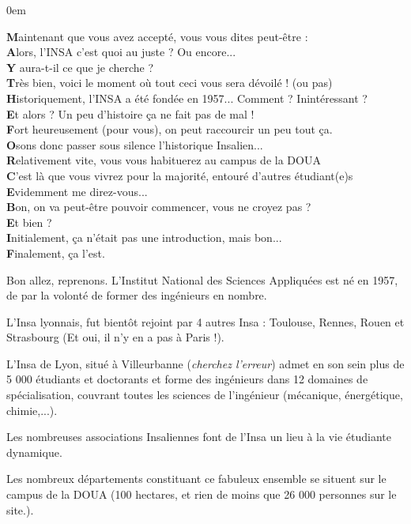 {
    \footnotesize
    \parindent 0em
    \begin{changemargin}{-1cm}{0cm}
\textbf{M}aintenant que vous avez accepté, vous vous dites peut-être :\\
\textbf{A}lors, l'INSA c'est quoi au juste ? Ou encore...\\
\textbf{Y} aura-t-il ce que je cherche ?\\

\textbf{T}rès bien, voici le moment où tout ceci vous sera dévoilé ! (ou pas)\\
\textbf{H}istoriquement, l'INSA a été fondée en 1957... Comment ? Inintéressant ?\\
\textbf{E}t alors ? Un peu d'histoire ça ne fait pas de mal !\\

\textbf{F}ort heureusement (pour vous), on peut raccourcir un peu tout ça.\\
\textbf{O}sons donc passer sous silence l'historique Insalien...\\
\textbf{R}elativement vite, vous vous habituerez au campus de la DOUA\\
\textbf{C}'est là que vous vivrez pour la majorité, entouré d'autres étudiant(e)s\\
\textbf{E}videmment me direz-vous...\\

\textbf{B}on, on va peut-être pouvoir commencer, vous ne croyez pas ?\\
\textbf{E}t bien ?\\

\textbf{I}nitialement, ça n'était pas une introduction, mais bon...\\
\textbf{F}inalement, ça l'est.\\
\end{changemargin}
} %

Bon allez, reprenons.
L'Institut National des Sciences Appliquées est né en 1957, de par la volonté de
former des ingénieurs en nombre.

L'Insa lyonnais, fut bientôt rejoint par 4 autres Insa : Toulouse, Rennes, Rouen
et Strasbourg (Et oui, il n'y en a pas à Paris !).

L'Insa de Lyon, situé à Villeurbanne (\emph{cherchez l'erreur}) admet en son sein plus
de 5 000 étudiants et doctorants et forme des ingénieurs dans 12 domaines de
spécialisation, couvrant toutes les sciences de l'ingénieur (mécanique,
énergétique, chimie,...).

Les nombreuses associations Insaliennes font de l'Insa un lieu à la vie
étudiante dynamique.

Les nombreux départements constituant ce fabuleux ensemble se situent sur le
campus de la DOUA (100 hectares, et rien de moins que 26 000 personnes sur le
site.).

